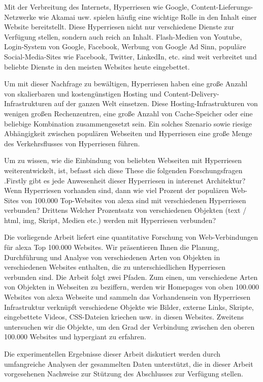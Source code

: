 Mit der Verbreitung des Internets, Hyperriesen wie Google, Content-Lieferungs-Netzwerke wie Akamai usw. spielen häufig eine wichtige Rolle in den Inhalt einer Website bereitstellt. Diese Hyperriesen nicht nur verschiedene Dienste zur Verfügung stellen, sondern auch reich an Inhalt. Flash-Medien von Youtube, Login-System von Google, Facebook, Werbung von Google Ad Sinn, populäre Social-Media-Sites wie Facebook, Twitter, LinkedIn, etc. sind weit verbreitet und beliebte Dienste in den meisten Websites heute eingebettet.

Um mit dieser Nachfrage zu bewältigen, Hyperriesen haben eine große Anzahl von skalierbaren und kostengünstigen Hosting und Content-Delivery-Infrastrukturen auf der ganzen Welt einsetzen. Diese Hosting-Infrastrukturen von wenigen großen Rechenzentren, eine große Anzahl von Cache-Speicher oder eine beliebige Kombination zusammengesetzt sein. Ein solches Szenario sowie riesige Abhängigkeit zwischen populären Webseiten und Hyperriesen eine große Menge des Verkehrsflusses von Hyperriesen führen.

Um zu wissen, wie die Einbindung von beliebten Webseiten mit Hyperriesen weiterentwickelt, ist, befasst sich diese These die folgenden Forschungsfragen .Firstly gibt es jede Anwesenheit dieser Hyperriesen in interenet Architektur? Wenn Hyperriesen vorhanden sind, dann wie viel Prozent der populären Web-Sites von 100.000 Top-Websites von alexa sind mit verschiedenen Hyperriesen verbunden? Drittens Welcher Prozentsatz von verschiedenen Objekten (text / html, img, Skript, Medien etc.) werden mit Hyperriesen verbunden?

Die vorliegende Arbeit liefert eine quantitative Forschung von Web-Verbindungen für alexa Top 100.000 Websites. Wir präsentieren Ihnen die Planung, Durchführung und Analyse von verschiedenen Arten von Objekten in verschiedenen Websites enthalten, die zu unterschiedlichen Hyperriesen verbunden sind. Die Arbeit folgt zwei Pfaden. Zum einen, um verschiedene Arten von Objekten in Webseiten zu beziffern, werden wir Homepages von oben 100.000 Websites von alexa Webseite und sammeln das Vorhandensein von Hyperriesen Infrastruktur verknüpft verschiedene Objekte wie Bilder, externe Links, Skripte, eingebettete Videos, CSS-Dateien kriechen usw. in diesen Websites. Zweitens untersuchen wir die Objekte, um den Grad der Verbindung zwischen den oberen 100.000 Websites und hypergiant zu erfahren.

Die experimentellen Ergebnisse dieser Arbeit diskutiert werden durch umfangreiche Analysen der gesammelten Daten unterstützt, die in dieser Arbeit vorgesehenen Nachweise zur Stützung des Abschlusses zur Verfügung stellen.